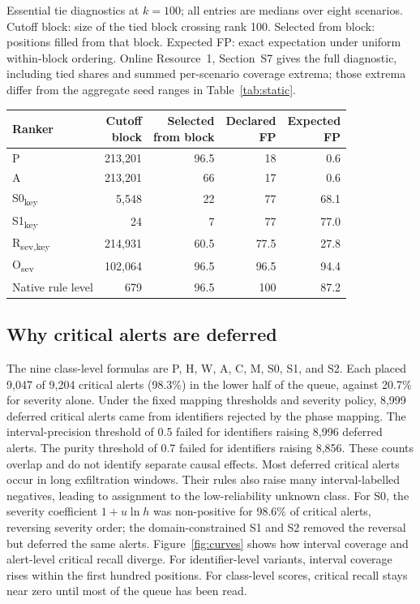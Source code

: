 \documentclass[pdflatex,sn-basic,Numbered]{sn-jnl}
\newcommand{\NCriticalAlerts}{9,204}
\newcommand{\DeferredCritical}{9,047}
\newcommand{\DeferredShare}{98.3}
\newcommand{\DeferredMappingRejected}{8,999}
\newcommand{\DeferredPrecisionRejected}{8,996}
\newcommand{\DeferredShareSeverity}{20.7}
\newcommand{\SZeroReversalShare}{98.6}
\begin{document}
\begin{tableorg}[t]
\centering
\caption{Essential tie diagnostics at $k=100$; all entries are medians over eight scenarios. Cutoff block: size of the tied block crossing rank 100. Selected from block: positions filled from that block. Expected FP: exact expectation under uniform within-block ordering. Online Resource~1, Section~S7 gives the full diagnostic, including tied shares and summed per-scenario coverage extrema; those extrema differ from the aggregate seed ranges in Table~\ref{tab:static}.}
\label{tab:ties}
\small
\begin{tabular}{lrrrr}
\toprule
Ranker & \shortstack{Cutoff\\block} & \shortstack{Selected\\from block} & \shortstack{Declared\\FP} & \shortstack{Expected\\FP} \\
\midrule
P & 213,201 & 96.5 & 18 & 0.6 \\
A & 213,201 & 66 & 17 & 0.6 \\
S0\textsubscript{key} & 5,548 & 22 & 77 & 68.1 \\
S1\textsubscript{key} & 24 & 7 & 77 & 77.0 \\
R\textsubscript{sev,key} & 214,931 & 60.5 & 77.5 & 27.8 \\
O\textsubscript{sev} & 102,064 & 96.5 & 96.5 & 94.4 \\
Native rule level & 679 & 96.5 & 100 & 87.2 \\
\bottomrule
\end{tabular}
\unskip
\end{tableorg}

\subsection{Why critical alerts are deferred}
\label{subsec:deferral}

The nine class-level formulas are P, H, W, A, C, M, S0, S1, and S2. Each placed \DeferredCritical{} of \NCriticalAlerts{} critical alerts (\DeferredShare\%) in the lower half of the queue, against \DeferredShareSeverity\% for severity alone. Under the fixed mapping thresholds and severity policy, \DeferredMappingRejected{} deferred critical alerts came from identifiers rejected by the phase mapping. The interval-precision threshold of 0.5 failed for identifiers raising \DeferredPrecisionRejected{} deferred alerts. The purity threshold of 0.7 failed for identifiers raising 8,856. These counts overlap and do not identify separate causal effects. Most deferred critical alerts occur in long exfiltration windows. Their rules also raise many interval-labelled negatives, leading to assignment to the low-reliability unknown class. For S0, the severity coefficient $1 + u\ln h$ was non-positive for \SZeroReversalShare\% of critical alerts, reversing severity order; the domain-constrained S1 and S2 removed the reversal but deferred the same alerts. Figure~\ref{fig:curves} shows how interval coverage and alert-level critical recall diverge. For identifier-level variants, interval coverage rises within the first hundred positions. For class-level scores, critical recall stays near zero until most of the queue has been read.
\end{document}

